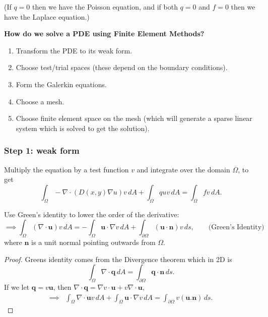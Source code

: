 \documentclass[12pt, a4paper]{article}
\renewcommand{\vec}[1]{\mathbf{#1}}
\theoremstyle{definition}
\theoremstyle{remark}
\numberwithin{equation}{section}
\begin{document}
(If $q=0$ then we have the Poisson equation, and if both $q=0$ and $f=0$ then we have the Laplace equation.)


\textbf{How do we solve a PDE using Finite Element Methods?}
\begin{enumerate}
\item Transform the PDE to its weak form. \label{step1}
\item Choose test/trial spaces (these depend on the boundary conditions). \label{step2}
\item Form the Galerkin equations. \label{step3}
\item Choose a mesh. \label{step4}
\item Choose finite element space on the mesh (which will generate a sparse linear system which is solved to get the solution). \label{step5}
\end{enumerate}

\newpage
\subsubsection{Step 1: weak form}
Multiply the equation by a test function $v$ and integrate over the domain $\Omega$, to get
\begin{equation*}
\int_{\Omega}-\nabla\cdot(D(x,y)\nabla u)v\,dA+\int_\Omega quv\,dA=\int_\Omega fv \, dA.
\end{equation*}

Use Green's identity to lower the order of the derivative:
\begin{equation*}
\implies \int_{\Omega}(\nabla\cdot \vec{u} )v\,dA=-\int_\Omega \vec{u}\cdot\nabla v \, dA + \int_{\partial \Omega} (\vec{u} \cdot \vec{n})v\, ds, \qquad\mbox{(Green's Identity)}
\end{equation*}
where $\vec{n}$ is a unit normal pointing outwards from $\Omega$.

\begin{proof}
Greens identity comes from the Divergence theorem which in 2D is 
\[\int_\Omega \nabla \cdot \vec{q} \, dA = \int_{\partial \Omega} \vec{q} \cdot \vec{n} \, ds.\]
If we let $\vec{q}=v\vec{u}$, then $\nabla \cdot \vec{q}= \nabla  v\cdot \vec{u}+v \nabla \cdot \vec{u}$,
\begin{align*}
\implies& \int_\Omega \nabla \cdot \vec{u}v \, dA +\int_{\Omega} \vec{u} \cdot \nabla v\, dA  = \int_{\partial \Omega}v(\vec{u}.\vec{n}) \, ds.
\end{align*}
\end{proof}
\end{document}
